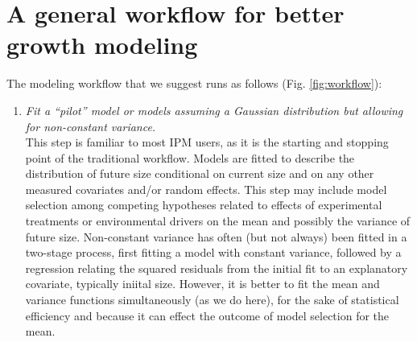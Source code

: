 \documentclass[11pt]{article}
\newcommand{\tom}[2]{{\color{red}{#1}}\footnote{\textit{\color{red}{#2}}}}
\begin{document}
{%

\section{A general workflow for better growth modeling}
The modeling workflow that we suggest runs as follows (Fig. \ref{fig:workflow}):
\begin{enumerate}
\item \textit{Fit a ``pilot'' model or models assuming a Gaussian distribution but allowing for non-constant variance.}
\\ 
This step is familiar to most IPM users, as it is the starting and stopping point of the traditional workflow. 
Models are fitted to describe the distribution of future size conditional on current size and on any other measured covariates and/or random effects. 
This step may include model selection among competing hypotheses related to effects of experimental treatments or environmental drivers on the mean and
possibly the variance of future size. 
Non-constant variance has often (but not always) been fitted in a two-stage process, first fitting a model with constant variance, 
followed by a regression relating the squared residuals from the initial fit to an explanatory covariate, typically iniital size. 
However, it is better to fit the mean and variance functions simultaneously (as we do here), for the sake of statistical efficiency and
because it can effect the outcome of model selection for the mean.  


\end{enumerate}}
\end{document}
